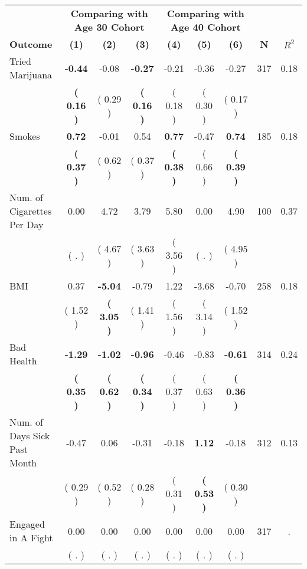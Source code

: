 \begin{tabular}{lcccccccc}
\toprule
 & \multicolumn{3}{c}{\textbf{Comparing with Age 30 Cohort}} & \multicolumn{3}{c}{\textbf{Comparing with Age 40 Cohort}} & \\
\cmidrule(lr){2-4} \cmidrule(lr){5-7} 
 \textbf{Outcome} & \textbf{(1)} & \textbf{(2)} & \textbf{(3)} & \textbf{(4)} & \textbf{(5)} & \textbf{(6)} & \textbf{N} & \textbf{$ R^2$} \\
\midrule
Tried Marijuana & \textbf{    -0.44} &     -0.08 & \textbf{    -0.27} &     -0.21 &     -0.36 &     -0.27 & 317 &       0.18 \\ 
 & \textbf{(     0.16 )} & (     0.29 ) & \textbf{(     0.16 )} & (     0.18 ) & (     0.30 ) & (     0.17 ) & \\
Smokes & \textbf{     0.72} &     -0.01 &      0.54 & \textbf{     0.77} &     -0.47 & \textbf{     0.74} & 185 &       0.18 \\ 
 & \textbf{(     0.37 )} & (     0.62 ) & (     0.37 ) & \textbf{(     0.38 )} & (     0.66 ) & \textbf{(     0.39 )} & \\
Num. of Cigarettes Per Day &      0.00 &      4.72 &      3.79 &      5.80 &      0.00 &      4.90 & 100 &       0.37 \\ 
 & (        . ) & (     4.67 ) & (     3.63 ) & (     3.56 ) & (        . ) & (     4.95 ) & \\
BMI &      0.37 & \textbf{    -5.04} &     -0.79 &      1.22 &     -3.68 &     -0.70 & 258 &       0.18 \\ 
 & (     1.52 ) & \textbf{(     3.05 )} & (     1.41 ) & (     1.56 ) & (     3.14 ) & (     1.52 ) & \\
Bad Health & \textbf{    -1.29} & \textbf{    -1.02} & \textbf{    -0.96} &     -0.46 &     -0.83 & \textbf{    -0.61} & 314 &       0.24 \\ 
 & \textbf{(     0.35 )} & \textbf{(     0.62 )} & \textbf{(     0.34 )} & (     0.37 ) & (     0.63 ) & \textbf{(     0.36 )} & \\
Num. of Days Sick Past Month &     -0.47 &      0.06 &     -0.31 &     -0.18 & \textbf{     1.12} &     -0.18 & 312 &       0.13 \\ 
 & (     0.29 ) & (     0.52 ) & (     0.28 ) & (     0.31 ) & \textbf{(     0.53 )} & (     0.30 ) & \\
Engaged in A Fight &      0.00 &      0.00 &      0.00 &      0.00 &      0.00 &      0.00 & 317 &          . \\ 
 & (        . ) & (        . ) & (        . ) & (        . ) & (        . ) & (        . ) & \\

\end{tabular}

